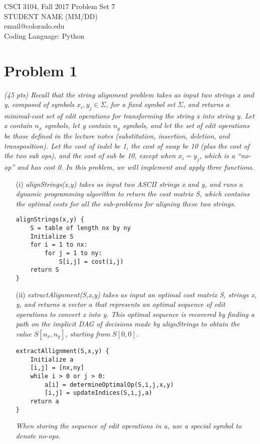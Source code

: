\documentclass[12pt]{article}
\begin{document}
\noindent CSCI 3104, Fall 2017 \hfill Problem Set 7 \\
STUDENT NAME (MM/DD) \\
email@colorado.edu \\
Coding Language: Python

\noindent\hrulefill

{\selectfont

\section*{{\selectfont Problem 1}}
\textit{(45 pts) Recall that the string alignment problem takes as input two strings x and y,
composed of symbols $x_i, y_j ∈ Σ$, for a fixed symbol set $Σ$, and returns a minimal-cost
set of edit operations for transforming the string x into string y. Let x contain $n_x$ symbols, let y contain $n_y$ symbols, and let the set of edit operations be those defined in the lecture notes (substitution, insertion, deletion, and transposition). Let the cost of indel be 1, the cost of swap be 10 (plus the cost of the two sub ops), and the cost of sub be 10, except when $x_i = y_j$, which is a “no-op” and has cost 0. In this problem, we will implement and apply three functions.}
\begin{enumerate}
\item[(i)] \textit{alignStrings(x,y) takes as input two ASCII strings x and y, and runs a dynamic programming algorithm to return the cost matrix S, which contains the optimal costs for all the sub-problems for aligning these two strings.}
\begin{small}
\begin{verbatim}
alignStrings(x,y) {
    S = table of length nx by ny
    Initialize S
    for i = 1 to nx:
        for j = 1 to ny:
            S[i,j] = cost(i,j)
    return S
}
\end{verbatim}
\end{small}

\item[(ii)] \textit{extractAlignment(S,x,y) takes as input an optimal cost matrix S, strings x, y, and returns a vector $a$ that represents an optimal sequence of edit operations to convert x into y. This optimal sequence is recovered by finding a path on the implicit DAG of decisions made by alignStrings to obtain the value $S[n_x, n_y]$, starting from $S[0,0]$.}
\begin{small}
\begin{verbatim}
extractAllignment(S,x,y) {
    Initialize a
    [i,j] = [nx,ny]
    while i > 0 or j > 0:
        a[i] = determineOptimalOp(S,i,j,x,y)
        [i,j] = updateIndices(S,i,j,a)
    return a
}
\end{verbatim}
\end{small}
\textit{When storing the sequence of edit operations in a, use a special symbol to denote
no-ops.}


\end{enumerate}}
\end{document}
